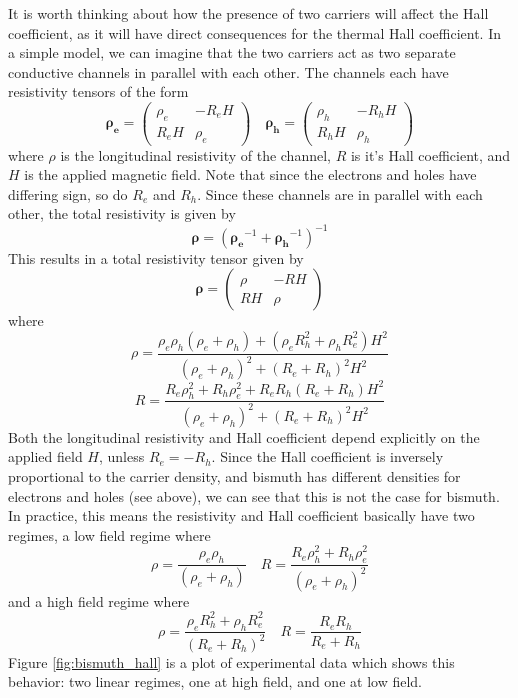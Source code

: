 \documentclass{thesis-umich}
\begin{document}
It is worth thinking about how the presence of two carriers will affect the Hall coefficient, as it will have direct consequences for the thermal Hall coefficient. In a simple model, we can imagine that the two carriers act as two separate conductive channels in parallel with each other. The channels each have resistivity tensors of the form
\[ \mathbf{\rho_e} = \begin{pmatrix}
		\rho_e & -R_eH \\
	R_eH & \rho_e \end{pmatrix} \quad
   \mathbf{\rho_h} = \begin{pmatrix}
   		\rho_h & -R_hH \\
	R_hH & \rho_h \end{pmatrix}\]
where $\rho$ is the longitudinal resistivity of the channel, $R$ is it's Hall coefficient, and $H$ is the applied magnetic field. Note that since the electrons and holes have differing sign, so do $R_e$ and $R_h$. Since these channels are in parallel with each other, the total resistivity is given by 
\[ \mathbf{\rho} = \left(\mathbf{\rho_e}^{-1} + \mathbf{\rho_h}^{-1}\right)^{-1} \]
This results in a total resistivity tensor given by
\[ \mathbf{\rho} = \begin{pmatrix}
		\rho & -RH \\
		RH & \rho \end{pmatrix} \]
where
\[ \rho = \frac{\rho_e \rho_h(\rho_e + \rho_h) + (\rho_e R_h^2 + \rho_h R_e^2)H^2}{(\rho_e + \rho_h)^2 + (R_e + R_h)^2H^2}\]
\[ R = \frac{R_e \rho_h^2 + R_h \rho_e^2 + R_e R_h (R_e + R_h)H^2}{(\rho_e + \rho_h)^2 + (R_e + R_h)^2 H^2} \]
Both the longitudinal resistivity and Hall coefficient depend explicitly on the applied field $H$, unless $R_e = -R_h$. Since the Hall coefficient is inversely proportional to the carrier density, and bismuth has different densities for electrons and holes (see above), we can see that this is not the case for bismuth. In practice, this means the resistivity and Hall coefficient basically have two regimes, a low field regime where
\[ \rho = \frac{\rho_e \rho_h}{(\rho_e + \rho_h)} \quad R = \frac{R_e \rho_h^2 + R_h \rho_e^2}{(\rho_e + \rho_h)^2} \]
and a high field regime where
\[ \rho = \frac{\rho_e R_h^2 + \rho_h R_e^2}{(R_e + R_h)^2} \quad R = \frac{R_e R_h}{R_e + R_h} \]
Figure \ref{fig:bismuth_hall} is a plot of experimental data which shows this behavior: two linear regimes, one at high field, and one at low field.
\end{document}
